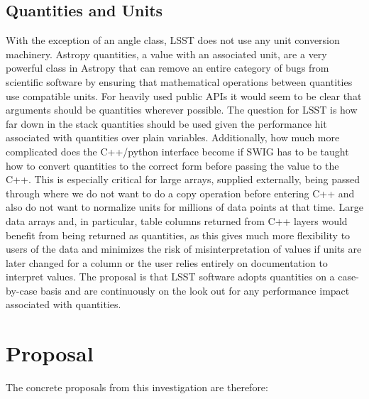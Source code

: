 \documentclass[]{spie}  %
\begin{document}
\subsection{Quantities and Units}

With the exception of an angle class, LSST does not use any unit conversion machinery.
Astropy quantities, a value with an associated unit, are a very powerful class in Astropy that can remove an entire category of bugs from scientific software by ensuring that mathematical operations between quantities use compatible units.
For heavily used public APIs it would seem to be clear that arguments should be quantities wherever possible.
The question for LSST is how far down in the stack quantities should be used given the performance hit associated with quantities over plain variables.
Additionally, how much more complicated does the C++/python interface become if SWIG has to be taught how to convert quantities to the correct form before passing the value to the C++.
This is especially critical for large arrays, supplied externally, being passed through where we do not want to do a copy operation before entering C++ and also do not want to normalize units for millions of data points at that time.
Large data arrays and, in particular, table columns returned from C++ layers would benefit from being returned as quantities, as this gives much more flexibility to users of the data and minimizes the risk of misinterpretation of values if units are later changed for a column or the user relies entirely on documentation to interpret values.
The proposal is that LSST software adopts quantities on a case-by-case basis and are continuously on the look out for  any performance impact associated with quantities.

\section{Proposal}

The concrete proposals from this investigation are therefore:
\end{document}
